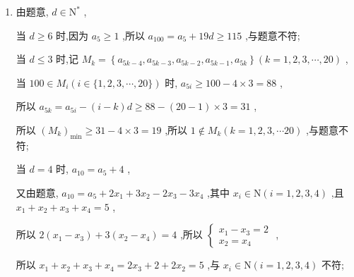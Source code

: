 \begin{enumerate}
\begin{jieda}
\begin{enumerate}
            此时 ${a}_{i} \geq  {a}_{1} + 2 > {a}_{1} + 1\left( {i = 2,3,4,\cdots ,m}\right)$ ,
            
            所以 ${a}_{1} + 1$ 不是等差数列 $\left\{  {a}_{n}\right\}$ 中的项,与题意不符,所以 $\left\{  {a}_{n}\right\}$ 不可能是等差数列;
            
            当 $d < 0$ 时,由题意, $d =  - 2$ 或-3,此时 ${a}_{i} \leq  {a}_{1} - 2 < {a}_{1} - 1\left( {i = 2,3,4,\cdots ,m}\right)$ , 所以 ${a}_{1} - 1$ 不是等差数列 $\left\{  {a}_{n}\right\}$ 中的项,与题意不符,所以 $\left\{  {a}_{n}\right\}$ 不可能是等差数列综上所述, $\left\{  {a}_{n}\right\}$ 不可能是等差数列
            \item 由题意, $d \in  {\mathrm{N}}^{ * }$ ,
            
            当 $d \geq  6$ 时,因为 ${a}_{5} \geq  1$ ,所以 ${a}_{100} = {a}_{5} + {19d} \geq  {115}$ ,与题意不符;
            
            当 $d \leq  3$ 时,记 ${M}_{k} = \left\{  {{a}_{{5k} - 4},{a}_{{5k} - 3},{a}_{{5k} - 2},{a}_{{5k} - 1},{a}_{5k}}\right\}  \left( {k = 1,2,3,\cdots ,{20}}\right)$ ,
            
            当 ${100} \in  {M}_{i}\left( {i \in  \{ 1,2,3,\cdots ,{20}\} }\right)$ 时, ${a}_{5i} \geq  {100} - 4 \times  3 = {88}$ ,
            
            所以 ${a}_{5k} = {a}_{5i} - \left( {i - k}\right) d \geq  {88} - \left( {{20} - 1}\right)  \times  3 = {31}$ ,
            
            所以 ${\left( {M}_{k}\right) }_{\min } \geq  {31} - 4 \times  3 = {19}$ ,所以 $1 \notin  {M}_{k}\left( {k = 1,2,3,\cdots {20}}\right)$ ,与题意不符;
            
            当 $d = 4$ 时, ${a}_{10} = {a}_{5} + 4$ ,
            
            又由题意, ${a}_{10} = {a}_{5} + 2{x}_{1} + 3{x}_{2} - 2{x}_{3} - 3{x}_{4}$ ,其中 ${x}_{i} \in  \mathrm{N}\left( {i = 1,2,3,4}\right)$ ,且 ${x}_{1} + {x}_{2} + {x}_{3} + {x}_{4} = 5$ ,
            
            所以 $2\left( {{x}_{1} - {x}_{3}}\right)  + 3\left( {{x}_{2} - {x}_{4}}\right)  = 4$ ,所以 $\left\{  \begin{array}{l} {x}_{1} - {x}_{3} = 2 \\  {x}_{2} = {x}_{4} \end{array}\right.$ ,
            
            所以 ${x}_{1} + {x}_{2} + {x}_{3} + {x}_{4} = 2{x}_{3} + 2 + 2{x}_{2} = 5$ ,与 ${x}_{i} \in  \mathrm{N}\left( {i = 1,2,3,4}\right)$ 不符;
            

\end{enumerate}
\end{jieda}
\end{enumerate}
